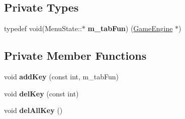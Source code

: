 \subsection*{Private Types}
\begin{DoxyCompactItemize}
\item 
\hypertarget{class_menu_state_aa884228b0539628333062f61e7163842}{}typedef void(Menu\+State\+::$\ast$ {\bfseries m\+\_\+tab\+Fun}) (\hyperlink{class_game_engine}{Game\+Engine} $\ast$)\label{class_menu_state_aa884228b0539628333062f61e7163842}

\end{DoxyCompactItemize}
\subsection*{Private Member Functions}
\begin{DoxyCompactItemize}
\item 
\hypertarget{class_menu_state_ab2cbc9220b30b8ebd178f08a6794f2a3}{}void {\bfseries add\+Key} (const int, m\+\_\+tab\+Fun)\label{class_menu_state_ab2cbc9220b30b8ebd178f08a6794f2a3}

\item 
\hypertarget{class_menu_state_aa8aa50863bfc53c4f02820ac5fcb914a}{}void {\bfseries del\+Key} (const int)\label{class_menu_state_aa8aa50863bfc53c4f02820ac5fcb914a}

\item 
\hypertarget{class_menu_state_a8558ca89bbacaccff767ef65e5db04b6}{}void {\bfseries del\+All\+Key} ()\label{class_menu_state_a8558ca89bbacaccff767ef65e5db04b6}

\end{DoxyCompactItemize}
